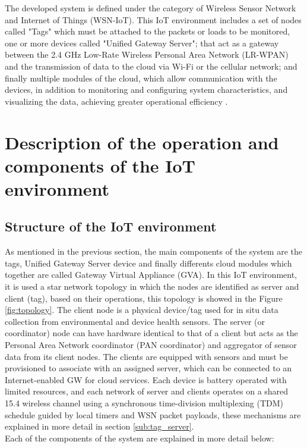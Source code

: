\documentclass[journal]{IEEEtran}	%
\begin{document}
The developed system is defined under the category of Wireless Sensor Network and Internet of Things (WSN-IoT). This IoT environment includes a set of nodes called "Tags" which must be attached to the packets or loads to be monitored, one or more devices called "Unified Gateway Server"; that act as a gateway between the 2.4 GHz Low-Rate Wireless Personal Area Network (LR-WPAN) and the transmission of data to the cloud via Wi-Fi or the cellular network; and finally multiple modules of the cloud, which allow communication with the devices, in addition to monitoring and configuring system characteristics, and visualizing the data, achieving greater operational efficiency \cite{williams2017weaving}.

\section{Description of the operation and components of the IoT environment}

\subsection{Structure of the IoT environment}

As mentioned in the previous section, the main components of the system are the tags, Unified Gateway Server device and finally differents cloud modules which together are called Gateway Virtual Appliance (GVA).
In this IoT environment, it is used a star network topology in which the nodes are identified as server and client (tag), based on their operations, this topology is showed in the Figure \ref{fig:topology}. The client node is a physical device/tag used for in situ data collection from environmental and device health sensors. The server (or coordinator) node can have hardware identical to that of a client but acts as the Personal Area Network coordinator (PAN coordinator) and aggregator of sensor data from its client nodes. The clients are equipped with sensors and must be provisioned to associate with an assigned server, which can be connected to an Internet-enabled GW for cloud services. Each device is battery operated with limited resources, and each network of server and clients operates on a shared 15.4 wireless channel using a synchronous time-division multiplexing (TDM) schedule guided by local timers and WSN packet payloads, these mechanisms are explained in more detail in section \ref{sub:tag_server}.\\

Each of the components of the system are explained in more detail below:
\end{document}

